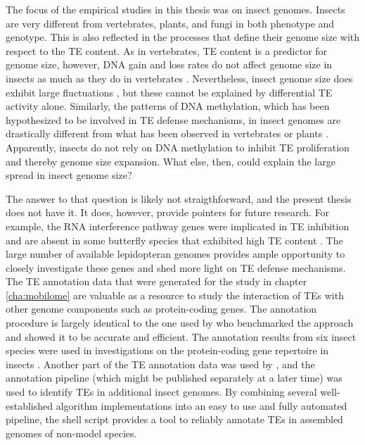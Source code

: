 The focus of the empirical studies in this thesis was on insect genomes.
Insects are very different from vertebrates, plants, and fungi in both phenotype
and genotype. This is also reflected in the processes that define their
genome size with respect to the TE content. As in vertebrates, TE
content is a predictor for genome size, however,  DNA gain and loss
rates do not affect genome size in insects as much as they do in
vertebrates \citep{Kapusta2017-1,Lindblad-Toh2005}.  Nevertheless,
insect genome size does exhibit large fluctuations \citep{Alfsnes2017},
but these cannot be explained by differential TE activity alone.
Similarly, the patterns of DNA methylation, which has been hypothesized
to be involved in TE defense mechanisms, in insect genomes are
drastically different from what has been observed in vertebrates or
plants \citep{Provataris2018,Suzuki2008}.  Apparently, insects do not
rely on DNA methylation to inhibit TE proliferation and thereby genome
size expansion. What else, then, could explain the large spread in
insect genome size?

The answer to that question is likely not straigthforward, and the
present thesis does not have it. It does, however, provide pointers for
future research. For example, the RNA interference pathway genes were
implicated in TE inhibition \citep{Aravin2001,Czech2008} and are absent
in some butterfly species that exhibited high TE content
\citep{Dowling2017}.  The large number of available lepidopteran genomes
provides ample opportunity to closely investigate these genes and shed
more light on TE defense mechanisms.  The TE annotation data that were
generated for the study in chapter \ref{cha:mobilome} are valuable as a
resource to study the interaction of TEs with other genome components
such as protein-coding genes. The annotation procedure is largely
identical to the one used by \citet{Reinar2016} who benchmarked the
approach and showed it to be accurate and efficient. The annotation
results from six insect species  were
used in investigations on the protein-coding gene repertoire in insects
. Another part of the TE annotation data was
used by \citep{Provataris2018}, and the annotation pipeline (which might
be published separately at a later time) was used to identify TEs in
additional insect genomes. By combining several well-established
algorithm implementations into an easy to use and fully automated
pipeline, the shell script provides a tool to reliably annotate TEs in
assembled genomes of non-model species. 


